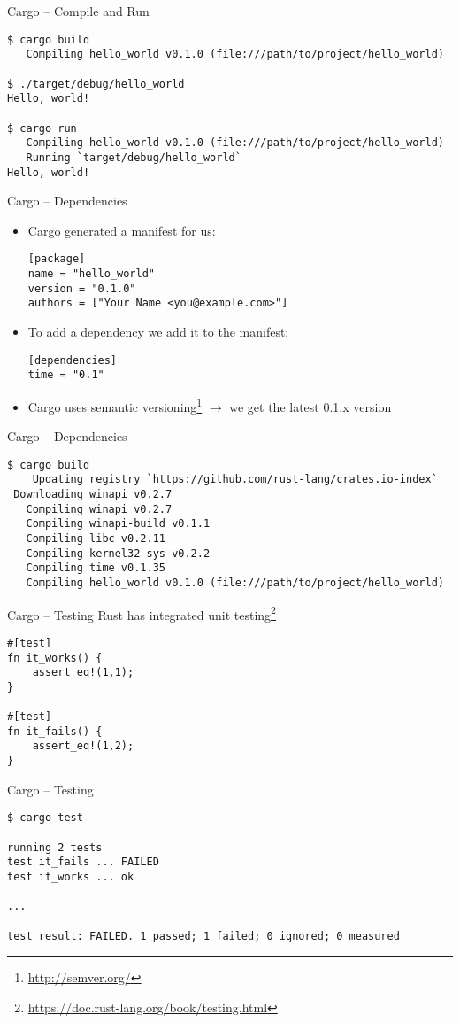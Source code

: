 \begin{frame}[fragile]{Cargo -- Compile and Run}
\begin{verbatim}
$ cargo build
   Compiling hello_world v0.1.0 (file:///path/to/project/hello_world)

$ ./target/debug/hello_world
Hello, world!

$ cargo run
   Compiling hello_world v0.1.0 (file:///path/to/project/hello_world)
   Running `target/debug/hello_world`
Hello, world!
\end{verbatim}
\end{frame}

\begin{frame}[fragile]{Cargo -- Dependencies}
\begin{itemize}
    \item Cargo generated a manifest for us:
\begin{verbatim}
[package]
name = "hello_world"
version = "0.1.0"
authors = ["Your Name <you@example.com>"]
\end{verbatim}
    \item To add a dependency we add it to the manifest:
\begin{verbatim}
[dependencies]
time = "0.1"
\end{verbatim}
    \item Cargo uses semantic versioning\footnote{\url{http://semver.org/}}
    $\rightarrow$ we get the latest 0.1.x version
\end{itemize}
\end{frame}

\begin{frame}[fragile]{Cargo -- Dependencies}
\begin{verbatim}
$ cargo build
    Updating registry `https://github.com/rust-lang/crates.io-index`
 Downloading winapi v0.2.7
   Compiling winapi v0.2.7
   Compiling winapi-build v0.1.1
   Compiling libc v0.2.11
   Compiling kernel32-sys v0.2.2
   Compiling time v0.1.35
   Compiling hello_world v0.1.0 (file:///path/to/project/hello_world)
\end{verbatim}
\end{frame}

\begin{frame}[fragile,c]{Cargo -- Testing}
	Rust has integrated unit testing\footnote{\url{https://doc.rust-lang.org/book/testing.html}}

\begin{verbatim}
#[test]
fn it_works() {
    assert_eq!(1,1);
}

#[test]
fn it_fails() {
    assert_eq!(1,2);
}
\end{verbatim}
\end{frame}

\begin{frame}[fragile,c]{Cargo -- Testing}
\begin{verbatim}
$ cargo test

running 2 tests
test it_fails ... FAILED
test it_works ... ok

...

test result: FAILED. 1 passed; 1 failed; 0 ignored; 0 measured
\end{verbatim}
\end{frame}
